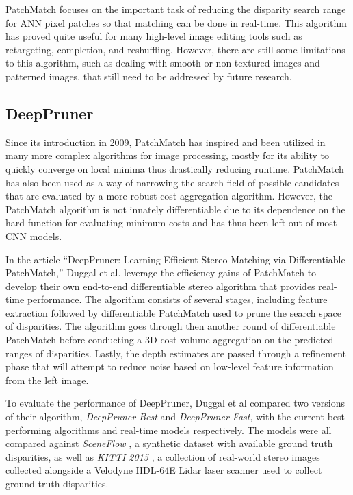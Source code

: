 \documentclass{article}
\begin{document}
PatchMatch focuses on the important task of reducing the disparity search range for ANN pixel patches so that matching can be done in real-time. This algorithm has proved quite useful for many high-level image editing tools such as retargeting, completion, and reshuffling. However, there are still some limitations to this algorithm, such as dealing with smooth or non-textured images and patterned images, that still need to be addressed by future research.

\subsection{DeepPruner \citep{duggal2019deeppruner}}
\label{deeppruner}
Since its introduction in 2009, PatchMatch \citep{barnes2009patchmatch} has inspired and been utilized in many more complex algorithms for image processing, mostly for its ability to quickly converge on local minima thus drastically reducing runtime. PatchMatch has also been used as a way of narrowing the search field of possible candidates that are evaluated by a more robust cost aggregation algorithm. However, the PatchMatch algorithm is not innately differentiable due to its dependence on the hard  function for evaluating minimum costs and has thus been left out of most CNN models.

In the article “DeepPruner: Learning Efficient Stereo Matching via Differentiable PatchMatch,” Duggal et al. \citep{duggal2019deeppruner} leverage the efficiency gains of PatchMatch to develop their own end-to-end differentiable stereo algorithm that provides real-time performance. The algorithm consists of several stages, including feature extraction followed by differentiable PatchMatch used to prune the search space of disparities. The algorithm goes through then another round of differentiable PatchMatch before conducting a 3D cost volume aggregation on the predicted ranges of disparities. Lastly, the depth estimates are passed through a refinement phase that will attempt to reduce noise based on low-level feature information from the left image.

To evaluate the performance of DeepPruner, Duggal et al \citep{duggal2019deeppruner} compared two versions of their algorithm, \textit{DeepPruner-Best} and \textit{DeepPruner-Fast}, with the current best-performing algorithms and real-time models respectively. The models were all compared against \textit{SceneFlow} \citep{mayer2016large}, a synthetic dataset with available ground truth disparities, as well as \textit{KITTI 2015} \citep{geiger2012we}, a collection of real-world stereo images collected alongside a Velodyne HDL-64E Lidar laser scanner used to collect ground truth disparities.
\end{document}
